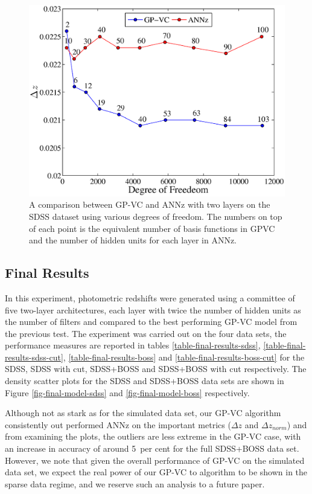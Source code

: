 \documentclass[useAMS,usenatbib,fleqn]{mn2e}
\begin{document}
\begin{figure}
	\centering
	\includegraphics[width=\columnwidth]{figures/sdss_final.eps}
	\caption{A comparison between GP-VC and {\sc ANNz} with two layers on the SDSS dataset using various degrees of freedom. The numbers on top of each point is the equivalent number of basis functions in GPVC and the number of hidden units for each layer in {\sc ANNz}.}
	\label{fig-ann-gpvc-sdss}
\end{figure}

\subsection{Final Results}

In this experiment, photometric redshifts were generated using a committee of five two-layer architectures, each layer with twice the number of hidden units as the number of filters and compared to the best performing GP-VC model from the previous test. The experiment was carried out on the four data sets, the performance measures are reported in tables \ref{table-final-results-sdss}, \ref{table-final-results-sdss-cut}, \ref{table-final-results-boss} and \ref{table-final-results-boss-cut} for the SDSS, SDSS with cut, SDSS+BOSS and SDSS+BOSS with cut respectively. The density scatter plots for the SDSS and SDSS+BOSS data sets are shown in Figure \ref{fig-final-model-sdss} and \ref{fig-final-model-boss} respectively. 

Although not as stark as for the simulated data set, our GP-VC algorithm consistently out performed {\sc ANNz} on the important metrics ($\Delta z$ and $\Delta z_{norm}$) and from examining the plots, the outliers are less extreme in the GP-VC case, with an increase in accuracy of around 5~per cent for the full SDSS+BOSS data set. However, we note that given the overall performance of GP-VC on the simulated data set, we expect the real power of our GP-VC to algorithm to be shown in the sparse data regime, and we reserve such an analysis to a future paper.
\end{document}
